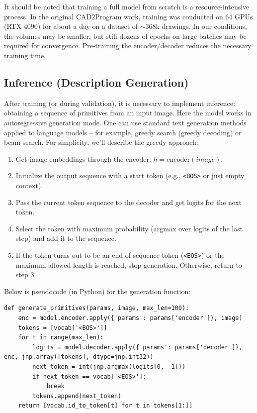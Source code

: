 \documentclass{article}
\begin{document}
It should be noted that training a full model from scratch is a resource-intensive process. In the original CAD2Program work, training was conducted on 64 GPUs (RTX 4090) for about a day on a dataset of $\sim$368k drawings. In our conditions, the volumes may be smaller, but still dozens of epochs on large batches may be required for convergence. Pre-training the encoder/decoder reduces the necessary training time.

\subsection{Inference (Description Generation)}

After training (or during validation), it is necessary to implement inference: obtaining a sequence of primitives from an input image. Here the model works in autoregressive generation mode. One can use standard text generation methods applied to language models – for example, greedy search (greedy decoding) or beam search. For simplicity, we'll describe the greedy approach:
\begin{enumerate}
\item Get image embeddings through the encoder: $h = \text{encoder}(image)$.
\item Initialize the output sequence with a start token (e.g., \texttt{<BOS>} or just empty context).
\item Pass the current token sequence to the decoder and get logits for the next token.
\item Select the token with maximum probability (argmax over logits of the last step) and add it to the sequence.
\item If the token turns out to be an end-of-sequence token (\texttt{<EOS>}) or the maximum allowed length is reached, stop generation. Otherwise, return to step 3.
\end{enumerate}

Below is pseudocode (in Python) for the generation function:

\begin{lstlisting}
def generate_primitives(params, image, max_len=100):
    enc = model.encoder.apply({'params': params['encoder']}, image)
    tokens = [vocab['<BOS>']]
    for t in range(max_len):
        logits = model.decoder.apply({'params': params['decoder']}, enc, jnp.array([tokens], dtype=jnp.int32))
        next_token = int(jnp.argmax(logits[0, -1]))
        if next_token == vocab['<EOS>']:
            break
        tokens.append(next_token)
    return [vocab.id_to_token[t] for t in tokens[1:]]
\end{lstlisting}
\end{document}
